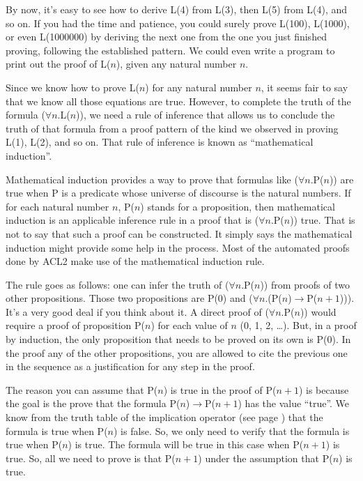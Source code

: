 By now, it's easy to see how to derive L(4) from L(3), then L(5) from L(4), and so on. If you had the time and patience, you could surely prove L(100), L(1000), or even L(1000000) by deriving the next one from the one you just finished proving, following the established pattern. We could even write a program to print out the proof of L($n$), given any natural number $n$.

Since we know how to prove L($n$) for any natural number $n$, it seems fair to say that we know all those equations are true. However, to complete the truth of the formula ($\forall$$n$.L($n$)), we need a rule of inference that allows us to conclude the truth of that formula from a proof pattern of the kind we observed in proving L(1), L(2), and so on. That rule of inference is known as ``mathematical induction''.

Mathematical induction provides a way to prove that formulas like ($\forall$$n$.P($n$)) are true when P is a predicate whose universe of discourse is the natural numbers. If for each natural number $n$, P($n$) stands for a proposition, then mathematical induction is an applicable inference rule in a proof that is ($\forall$$n$.P($n$)) true. That is not to say that such a proof can be constructed. It simply says the mathematical induction might provide some help in the process.
Most of the automated proofs done by ACL2 make use of the mathematical induction rule.

The rule goes as follows: one can infer the truth of ($\forall$$n$.P($n$)) from proofs of two other propositions. Those two propositions are P(0) and ($\forall$$n$.(P($n$)$\rightarrow$P($n+1$))). It's a very good deal if you think about it. A direct proof of ($\forall$$n$.P($n$)) would require a proof of proposition P($n$) for each value of $n$ (0, 1, 2, \dots). But, in a proof by induction, the only proposition that needs to be proved on its own is P(0). In the proof any of the other propositions, you are allowed to cite the previous one in the sequence as a justification for any step in the proof.

The reason you can assume that P($n$) is true in the proof of P($n+1$) is because the goal is the prove that the formula P($n$)$\rightarrow$P($n+1$) has the value ``true''. We know from the truth table of the implication operator (see page \pageref{implication-truth-table}) that the formula is true when P($n$) is false. So, we only need to verify that the formula is true when P($n$) is true. The formula will be true in this case when P($n+1$) is true. So, all we need to prove is that P($n+1$) under the assumption that P($n$) is true.

